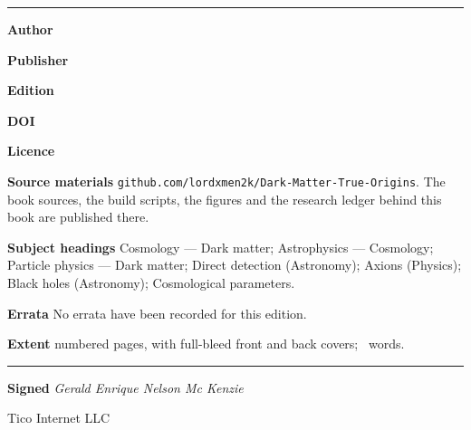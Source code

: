 \clearpage
\thispagestyle{empty}
\vspace*{1.0in}
\begin{center}
\begin{minipage}{0.92\textwidth}
{\sffamily\fontsize{15}{18}\selectfont\bfseries\color{txt} \bookTitle\par}
\vspace{4pt}
{\sffamily\small\color{txtdim} \bookSubtitle\par}
\vspace{18pt}
{\color{accent}\rule{\textwidth}{1.6pt}}\par
\vspace{14pt}
{\small\color{txt}
\noindent\textbf{Author}\quad \bookAuthor\par
\vspace{4pt}
\noindent\textbf{Publisher}\quad \bookImprint\par
\vspace{4pt}
\noindent\textbf{Edition}\quad \bookEdition\par
\vspace{4pt}
\noindent\textbf{DOI}\quad \href{https://doi.org/\bookDOI}{\texttt{\bookDOI}}\par
\vspace{4pt}
\noindent\textbf{Licence}\quad \bookLicense\par
\vspace{4pt}
\noindent\textbf{Source materials}\quad
\texttt{github.com/lordxmen2k/Dark-Matter-True-Origins}. The book
sources, the build scripts, the figures and the research ledger behind this
book are published there.\par
\vspace{14pt}
\noindent\textbf{Subject headings}\quad
Cosmology --- Dark matter; Astrophysics --- Cosmology; Particle physics ---
Dark matter; Direct detection (Astronomy); Axions (Physics); Black holes
(Astronomy); Cosmological parameters.\par
\vspace{14pt}
\noindent\textbf{Errata}\quad
No errata have been recorded for this edition.\par
\vspace{14pt}
\noindent\textbf{Extent}\quad
\bookPages{} numbered pages, with full-bleed front and back
covers;\ \bookWords{} words.\par
\vspace{14pt}
\noindent\rule{\textwidth}{0.4pt}\par
\vspace{10pt}
\noindent\textbf{Signed}\quad
\emph{Gerald Enrique Nelson Mc Kenzie}\par
\vspace{4pt}
\noindent Tico Internet LLC\par
\vspace{4pt}
\noindent \bookFactsDate\par
}
\end{minipage}
\end{center}
